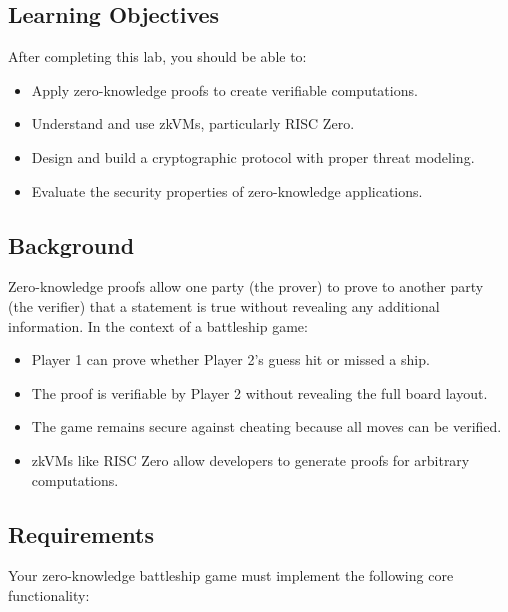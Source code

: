 \documentclass[10pt,a4paper,american]{article}
\begin{document}
\subsection*{Learning Objectives}
After completing this lab, you should be able to:
\begin{itemize}
	\item Apply zero-knowledge proofs to create verifiable computations.
	\item Understand and use zkVMs, particularly RISC Zero.
	\item Design and build a cryptographic protocol with proper threat modeling.
	\item Evaluate the security properties of zero-knowledge applications.
\end{itemize}

\subsection*{Background}
Zero-knowledge proofs allow one party (the prover) to prove to another party (the verifier) that a statement is true without revealing any additional information. In the context of a battleship game:
\begin{itemize}
	\item Player 1 can prove whether Player 2's guess hit or missed a ship.
	\item The proof is verifiable by Player 2 without revealing the full board layout.
	\item The game remains secure against cheating because all moves can be verified.
	\item zkVMs like RISC Zero allow developers to generate proofs for arbitrary computations.
\end{itemize}

\subsection*{Requirements}
Your zero-knowledge battleship game must implement the following core functionality:
\end{document}
